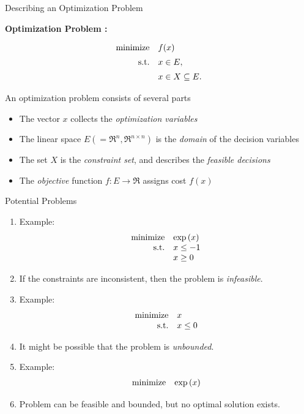 \documentclass[9pt]{beamer}
\begin{document}
\begin{frame}{Describing an Optimization Problem}

  \textbf{Optimization Problem :}

  \vfill
  \[
    \begin{array}{rl}
      \operatorname{minimize} & f(x) \\[0.5em]
      \mathrm{s.t.} & x \in E, \\[0.5em]
                & x\in X \subseteq E.
    \end{array}
  \]

  \vfill

  An optimization problem consists of several parts
  \begin{itemize}
  \item The vector $x$ collects the \emph{optimization variables}
  \item The linear space $E(=\Re^n, \Re^{n\times n})$ is the \emph{domain} of the decision variables
  \item The set $X$ is the \emph{constraint set}, and describes the \emph{feasible decisions}
  \item The \emph{objective} function $f:E\to\Re$ assigns cost $f(x)$
  \end{itemize}

\end{frame}

\begin{frame}{Potential Problems}

  \begin{enumerate}
  \item Example:
    \[
      \begin{array}{rl}
        \operatorname{minimize} & \exp{(x)} \\
        \mathrm{s.t.}  & x\leq -1 \\
                  & x \geq 0
      \end{array}
    \]

  \item<2-> If the constraints are inconsistent, then the problem is \emph{infeasible}.
  \item<3-> Example:
    \[
      \begin{array}{rl}
        \operatorname{minimize} & x \\
        \mathrm{s.t.}   & x\leq 0 \\
      \end{array}
    \]    
  \item<4-> It might be possible that the problem is \emph{unbounded}.
  \item<5-> Example:
    \[
      \begin{array}{rl}
        \operatorname{minimize} & \exp{(x)}
      \end{array}
    \]
  \item<6-> Problem can be feasible and bounded, but no optimal solution exists.
  \end{enumerate}
  
\end{frame}
\end{document}
